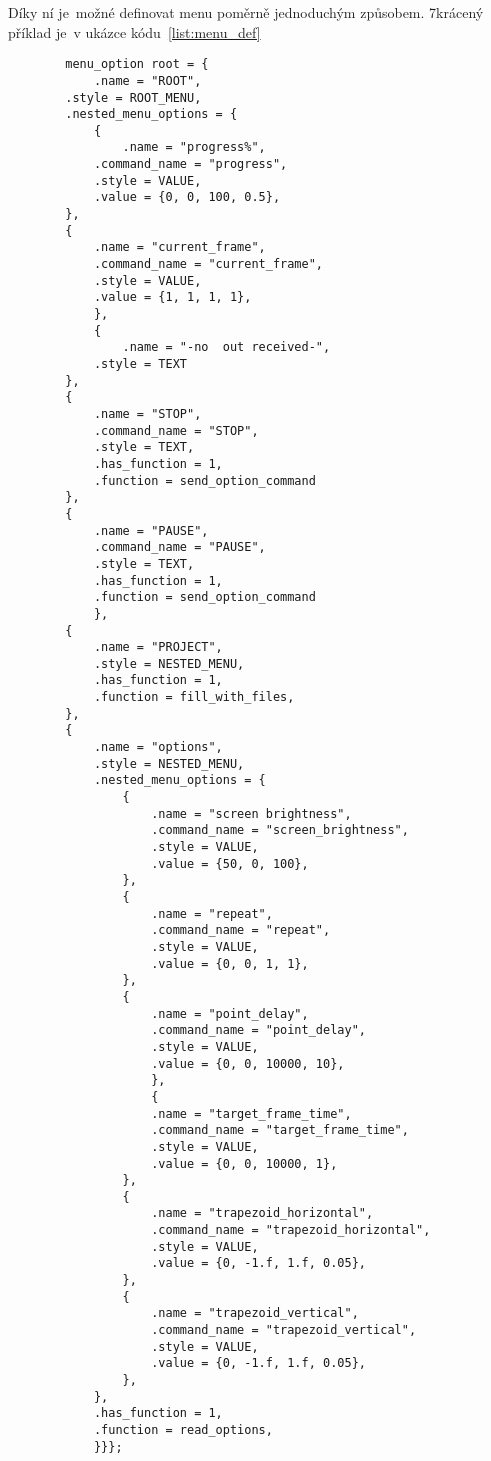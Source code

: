 Díky ní je~možné definovat menu poměrně jednoduchým způsobem. 7krácený příklad  je~v ukázce kódu~\ref{list:menu_def}
\begin{code}
    \begin{verbatim}
        menu_option root = {
            .name = "ROOT",
        .style = ROOT_MENU,
        .nested_menu_options = {
            {
                .name = "progress%",
            .command_name = "progress",
            .style = VALUE,
            .value = {0, 0, 100, 0.5},
        },
        {
            .name = "current_frame",
            .command_name = "current_frame",
            .style = VALUE,
            .value = {1, 1, 1, 1},
            },
            {
                .name = "-no  out received-",
            .style = TEXT
        },
        {
            .name = "STOP",
            .command_name = "STOP",
            .style = TEXT,
            .has_function = 1,
            .function = send_option_command
        },
        {
            .name = "PAUSE",
            .command_name = "PAUSE",
            .style = TEXT,
            .has_function = 1,
            .function = send_option_command
            },
        {
            .name = "PROJECT",
            .style = NESTED_MENU,
            .has_function = 1,
            .function = fill_with_files,
        },
        {
            .name = "options",
            .style = NESTED_MENU,
            .nested_menu_options = {
                {
                    .name = "screen brightness",
                    .command_name = "screen_brightness",
                    .style = VALUE,
                    .value = {50, 0, 100},
                },
                {
                    .name = "repeat",
                    .command_name = "repeat",
                    .style = VALUE,
                    .value = {0, 0, 1, 1},
                },
                {
                    .name = "point_delay",
                    .command_name = "point_delay",
                    .style = VALUE,
                    .value = {0, 0, 10000, 10},
                    },
                    {
                    .name = "target_frame_time",
                    .command_name = "target_frame_time",
                    .style = VALUE,
                    .value = {0, 0, 10000, 1},
                },
                {
                    .name = "trapezoid_horizontal",
                    .command_name = "trapezoid_horizontal",
                    .style = VALUE,
                    .value = {0, -1.f, 1.f, 0.05},
                },
                {
                    .name = "trapezoid_vertical",
                    .command_name = "trapezoid_vertical",
                    .style = VALUE,
                    .value = {0, -1.f, 1.f, 0.05},
                },
            },
            .has_function = 1,
            .function = read_options,
            }}};
        \end{verbatim}
    \end{code}
        
